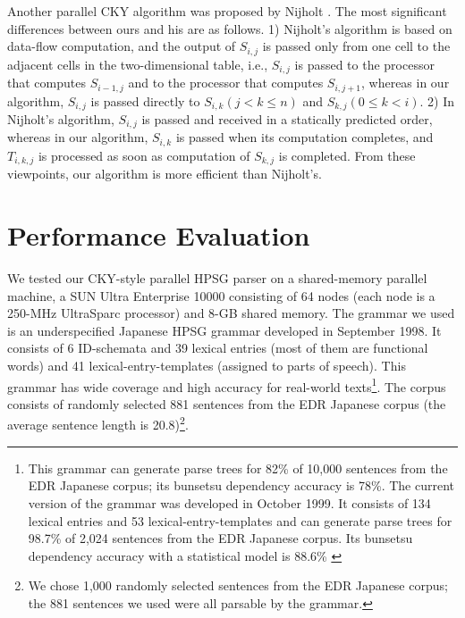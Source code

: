   Another parallel CKY algorithm was proposed by Nijholt
\cite{Nijholt}.  The most significant differences between ours and his
are as follows.  1) Nijholt's algorithm is based on data-flow
computation, and the output of $S_{i,j}$ is passed only from one cell
to the adjacent cells in the two-dimensional table, i.e., $S_{i,j}$ is
passed to the processor that computes $S_{i-1,j}$ and to the processor
that computes $S_{i,j+1}$, whereas in our algorithm, $S_{i,j}$ is
passed directly to $S_{i,k}(j < k \leq n)$ and $S_{k,j}(0 \leq k <
i)$.  2) In Nijholt's algorithm, $S_{i,j}$ is passed and received in a
statically predicted order, whereas in our algorithm, $S_{i,k}$ is
passed when its computation completes, and $T_{i,k,j}$ is processed as
soon as computation of $S_{k,j}$ is completed.  From these viewpoints,
our algorithm is more efficient than Nijholt's.

\section{Performance Evaluation}
  We tested our CKY-style parallel HPSG parser on a shared-memory
parallel machine, a SUN Ultra Enterprise 10000 consisting of 64 nodes
(each node is a 250-MHz UltraSparc processor) and 8-GB shared memory.
The grammar we used is an underspecified Japanese HPSG grammar
\cite{Mitsuishi98} developed in September 1998.  It consists of 6
ID-schemata and 39 lexical entries (most of them are functional words)
and 41 lexical-entry-templates (assigned to parts of speech).  This
grammar has wide coverage and high accuracy for real-world
texts\footnote{This grammar can generate parse trees for 82\% of
10,000 sentences from the EDR Japanese corpus; its bunsetsu dependency
accuracy is 78\%.  The current version of the grammar was developed in
October 1999.  It consists of 134 lexical entries and 53
lexical-entry-templates and can generate parse trees for 98.7\% of
2,024 sentences from the EDR Japanese corpus.  Its bunsetsu dependency
accuracy with a statistical model is 88.6\% \cite{Kanayama2000}}.  The
corpus consists of randomly selected 881 sentences from the EDR
Japanese corpus (the average sentence length is 20.8)\footnote{We
chose 1,000 randomly selected sentences from the EDR Japanese corpus;
the 881 sentences we used were all parsable by the grammar.}.


